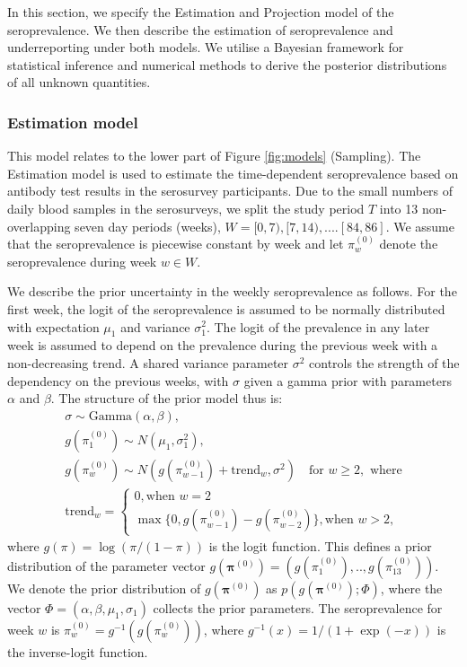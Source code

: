 \documentclass[aoas]{imsart}
\begin{document}
In this section, we specify the Estimation and Projection model of the seroprevalence. We then describe the estimation of seroprevalence and underreporting under both models. We utilise a Bayesian framework for statistical inference and numerical methods to derive the posterior distributions of all unknown quantities.

\subsubsection{Estimation model} \label{seq:model1}

This model relates to the lower part of Figure \ref{fig:models} (Sampling). The Estimation model is used to estimate the time-dependent seroprevalence based on antibody test results in the serosurvey participants. Due to the small numbers of daily blood samples in the serosurveys, we split the study period $T$ into 13 non-overlapping seven day periods (weeks), $W = [0,7), [7,14), .... [84, 86]$. We assume that the seroprevalence is piecewise constant by week and let $\pi^{(0)}_w$ denote the seroprevalence during week $w \in W$. 

We describe the prior uncertainty in the weekly seroprevalence as follows. For the first week, the logit of the seroprevalence is assumed to be normally distributed with expectation $\mu_1$ and variance $\sigma_1^2$. The logit of the prevalence in any later week is assumed to depend on the prevalence during the previous week with a non-decreasing trend. A shared variance parameter $\sigma^2$ controls the strength of the dependency on the previous weeks, with $\sigma$ given a gamma prior with parameters $\alpha$ and $\beta$. The structure of the prior model thus is:
\begin{equation}\label{eq:model1_prior}
\begin{split}
\sigma \sim \text{Gamma}(\alpha, \beta), \\
g(\pi^{(0)}_1) \sim N(\mu_1, \sigma_{1}^2), \\
g(\pi^{(0)}_w) \sim N(g(\pi^{(0)}_{w-1}) +  \text{trend}_w, \sigma^2 )  \quad \text{for } w \geq 2, \text{ where}\\
\text{trend}_w =
\begin{cases}
0,  \text{when } w = 2 \\
\max\{0, g(\pi^{(0)}_{w-1}) - g(\pi^{(0)}_{w-2})\}, \text{when } w > 2,
\end{cases}
\end{split}
\end{equation}
where $g(\pi) = \log(\pi / (1-\pi))$ is the logit function. This defines a prior distribution of the parameter vector $g(\mathbf{\pi}^{(0)}) = (g(\pi^{(0)}_1), ..,  g(\pi^{(0)}_{13}))$. We denote the prior distribution of $g(\mathbf{\pi}^{(0)})$ as $p(g(\mathbf{\pi}^{(0)}); \Phi)$, where the vector $\Phi=(\alpha, \beta, \mu_1, \sigma_1)$ collects the prior parameters. The seroprevalence for week $w$ is $\pi_w^{(0)} = g^{-1}(g(\pi_w^{(0)}))$, where $g^{-1}(x) = 1 / (1 + \exp (-x))$ is the inverse-logit function. 
\end{document}
